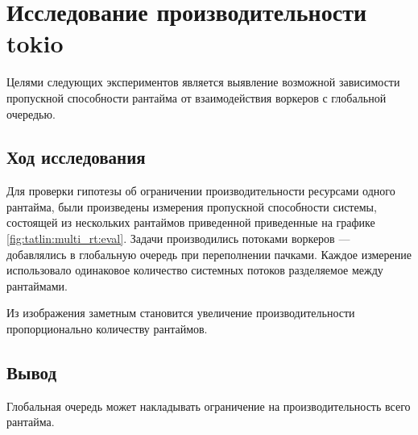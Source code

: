 
\section{Исследование производительности tokio}

Целями следующих экспериментов является выявление возможной зависимости пропускной способности рантайма от взаимодействия воркеров с глобальной очередью.

\subsection{Ход исследования}

Для проверки гипотезы об ограничении производительности ресурсами одного рантайма, были произведены измерения пропускной способности системы, состоящей из нескольких рантаймов приведенной приведенные на графике \ref{fig:tatlin:multi_rt:eval}. Задачи производились потоками воркеров --- добавлялись в глобальную очередь при переполнении пачками. Каждое измерение использовало одинаковое количество системных потоков разделяемое между рантаймами.



Из изображения заметным становится увеличение производительности пропорционально количеству рантаймов.

\subsection{Вывод}

Глобальная очередь может накладывать ограничение на производительность всего рантайма.

